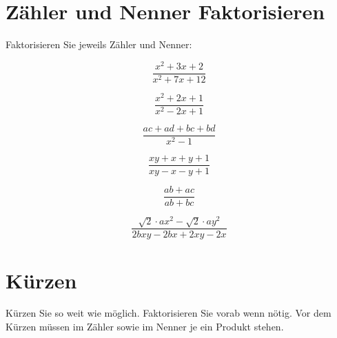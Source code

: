 \section{Zähler und Nenner Faktorisieren}
Faktorisieren Sie jeweils Zähler und Nenner:

\begin{bbwAufgabenBlock}
\item $$\frac{x^2+3x+2}{x^2+7x+12}$$

\item $$\frac{x^2+2x+1}{x^2-2x+1}$$

\item $$\frac{ac+ad+bc+bd}{x^2-1}$$

\item $$\frac{xy+x+y+1}{xy-x-y+1}$$

\item $$\frac{ab+ac}{ab+bc}$$

\item $$\frac{\sqrt{2}\cdot{}ax^2-\sqrt{2}\cdot{}ay^2}{2bxy-2bx+2xy-2x}$$


\end{bbwAufgabenBlock}
\newpage
\section{Kürzen}
Kürzen Sie so weit wie möglich. Faktorisieren Sie vorab wenn nötig.
Vor dem Kürzen müssen im Zähler sowie im Nenner je ein Produkt stehen.


